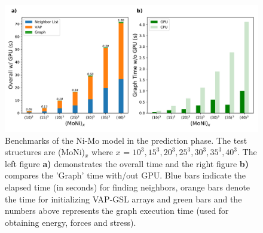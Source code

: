 \documentclass[preprint]{revtex4-2}
\begin{document}
% 
%
\begin{figure}[h!]
    \centering
    \includegraphics[scale=0.64]{figures/Prediction-speed.pdf}
\caption{\label{fig:prediction_speed} Benchmarks of the Ni-Mo model in 
the prediction phase. The test structures are (MoNi)$_{x}$ where 
$x$ = $10^3, 15^3, 20^3, 25^3, 30^3, 35^3, 40^3$. The left figure \textbf{a)} 
demonstrates the overall time and the right figure \textbf{b)} compares the 
'Graph' time with/out GPU. Blue bars indicate the elapsed time (in seconds) for 
finding neighbors, orange bars denote the time for initializing VAP-GSL arrays 
and green bars and the numbers above represents the graph execution time (used 
for obtaining energy, forces and stress).
}
\end{figure}
\end{document}

